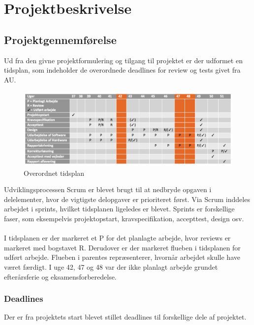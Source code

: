 \chapter{Projektbeskrivelse}

\section{Projektgennemførelse}
Ud fra den givne projektformulering og tilgang til projektet er der udformet en tidsplan, som indeholder de overordnede deadlines for review og tests givet fra AU.
\begin{figure}[H]
	\centering
	\includegraphics[width=1\textwidth]{Figurer/Snip20151210_74.png}
	\caption{Overordnet tidsplan}
\end{figure}
Udviklingsprocessen Scrum er blevet brugt til at nedbryde opgaven i delelementer, hvor de vigtigste delopgaver er prioriteret først. Via Scrum inddeles arbejdet i sprints, hvilket tidsplanen ligeledes er blevet. Sprints er forskellige faser, som eksempelvis projektopstart, kravspecifikation, accepttest, design osv.\\\\
I tidsplanen er der markeret et P for det planlagte arbejde, hvor reviews er markeret med bogstavet R. Derudover er der markeret flueben i tidsplanen for udført arbejde. Flueben i parentes repræsenterer, hvornår arbejdet skulle have været færdigt. I uge 42, 47 og 48 var der ikke planlagt arbejde grundet efterårsferie og eksamensforberedelse. 

\subsection{Deadlines}
Der er fra projektets start blevet stillet deadlines til forskellige dele af projektet.

